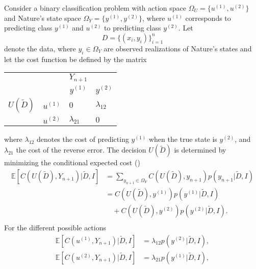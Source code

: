 \newpage
\begin{example}
	Consider a binary classification problem with action space $\Omega_U = \{u^{(1)},u^{(2)}\}$ and Nature's state space $\Omega_Y = \{y^{(1)}, y^{(2)}\}$, where $u^{(1)}$ corresponds to predicting class $y^{(1)}$ and $u^{(2)}$ to predicting class $y^{(2)}$. Let
	\begin{equation}
		D = \{(x_i,y_i)\}_{i=1}^n
	\end{equation}
	denote the data, where $y_i \in \Omega_Y$ are observed realizations of Nature's states and let the cost function be defined by the matrix
	\begin{center}
		\begin{tabular}{ c  c  c  c }
			&& $Y_{n+1}$& \\
			&& $y^{(1)}$ & $y^{(2)}$  \\
			\cline{3-4}
			$U(\tilde{D})$ & $u^{(1)}$& \multicolumn{1}{|l}{$0$} &\multicolumn{1}{l|}{$\lambda_{12}$}  \\
			& $u^{(2)}$& \multicolumn{1}{|l}{$\lambda_{21}$} & \multicolumn{1}{l|}{$0$} \\
			\cline{3-4}
		\end{tabular}
	\end{center}
	where $\lambda_{12}$ denotes the cost of predicting $y^{(1)}$ when the true state is $y^{(2)}$, and $\lambda_{21}$ the cost of the reverse error.  The decision $U(\tilde{D})$ is determined by minimizing the conditional expected cost ()
	\begin{equation}
		\begin{split}
			\mathbb{E}[C(U(\tilde{D}), Y_{n+1})|\tilde{D},I] & = \sum_{y_{n+1}\in \Omega_Y}C(U(\tilde{D}),y_{n+1})p(y_{n+1}|\tilde{D},I)\\
			& = C(U(\tilde{D}),y^{(1)})p(y^{(1)}|\tilde{D},I)\\
			& \quad+C(U(\tilde{D}),y^{(2)})p(y^{(2)}|\tilde{D},I).\\
		\end{split}
	\end{equation}
	For the different possible actions
	\begin{equation}
		\begin{split}
			\mathbb{E}[C(u^{(1)}, Y_{n+1})|\tilde{D},I] &= \lambda_{12}p(y^{(2)}|\tilde{D},I),\\
			\mathbb{E}[C(u^{(2)}, Y_{n+1})|\tilde{D},I] &= \lambda_{21}p(y^{(1)}|\tilde{D},I),\\
		\end{split}
	\end{equation}

\end{example}
